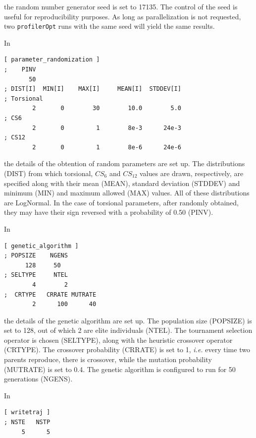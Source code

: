 \documentclass[10pt,a4paper,openany]{memoir}
\numberwithin{equation}{section}
\newcommand{\profileropt}[0]{\texttt{profilerOpt}}
\begin{document}
\noindent the random number generator seed is set to 17135.
%
The control of the seed is useful for reproducibility purposes.
%
As long as parallelization is not requested, two \profileropt{} runs
with the same seed will yield the same results.

In

\begin{lstlisting}[language=gromacs]
[ parameter_randomization ]
;    PINV
       50
; DIST[I]  MIN[I]    MAX[I]     MEAN[I]  STDDEV[I]
; Torsional
        2       0        30        10.0        5.0 
; CS6
        2       0         1        8e-3      24e-3
; CS12
        2       0         1        8e-6      24e-6
\end{lstlisting}\vspace{1ex}\par

\noindent the details of the obtention of random parameters are set
up.
%
The distributions (DIST) from which torsional, $CS_6$ and $CS_{12}$
values are drawn, respectively, are specified along with their mean
(MEAN), standard deviation (STDDEV) and minimum (MIN) and maximum
allowed (MAX) values.
%
All of these distributions are LogNormal.
%
In the case of torsional parameters, after randomly obtained, they may
have their sign reversed with a probability of 0.50 (PINV).

In 

\begin{lstlisting}[language=gromacs]
[ genetic_algorithm ]
; POPSIZE    NGENS
      128     50
; SELTYPE     NTEL
        4        2
;  CRTYPE   CRRATE MUTRATE
        2      100      40
\end{lstlisting}\vspace{1ex}\par

\noindent the details of the genetic algorithm are set up.
%
The population size (POPSIZE) is set to 128, out of which 2 are elite
individuals (NTEL).
%
The tournament selection operator is chosen (SELTYPE), along with the
heuristic crossover operator (CRTYPE).
%
The crossover probability (CRRATE) is set to 1, \textit{i.e.} every
time two parents reproduce, there is crossover, while the mutation
probability (MUTRATE) is set to 0.4.
%
The genetic algorithm is configured to run for 50 generations (NGENS).

In

\begin{lstlisting}[language=gromacs]
[ writetraj ]
; NSTE   NSTP
     5      5
\end{lstlisting}\vspace{1ex}\par
\end{document}
